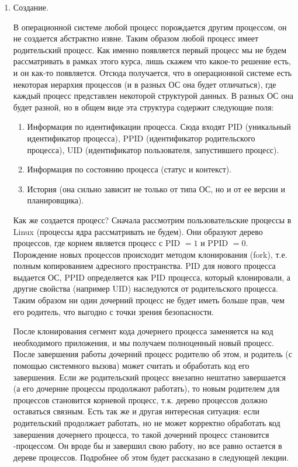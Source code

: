 
\begin{enumerate}
\item
  Создание.
  
  В операционной системе любой процесс порождается другим процессом, он не
  создается абстрактно извне. Таким образом любой процесс имеет родительский
  процесс. Как именно появляется первый процесс мы не будем рассматривать в
  рамках этого курса, лишь скажем что какое-то решение есть, и он как-то
  появляется. Отсюда получается, что в операционной системе есть некоторая
  иерархия процессов (и в разных ОС она будет отличаться), где каждый процесс
  представлен некоторой структурой данных. В разных ОС она будет разной, но в
  общем виде эта структура содержит следующие поля:
  
  \begin{enumerate}
  \item
    Информация по идентификации процесса. Сюда входят PID (уникальный
    идентификатор процесса), PPID (идентификатор родительского процесса), UID
    (идентификатор пользователя, запустившего процесс).
    
  \item
    Информация по состоянию процесса (статус и контекст).
    
  \item
    История (она сильно зависит не только от типа ОС, но и от ее версии и
    планировщика).
  \end{enumerate}
  
  Как же создается процесс? Сначала рассмотрим пользовательские процессы в Linux
  (процессы ядра рассматривать не будем). Они образуют дерево процессов, где
  корнем является процесс с PID \(= 1\) и PPID \(= 0\). Порождение новых
  процессов происходит методом клонирования (fork), т.е. полным копированием
  адресного пространства. PID для нового процесса выдается ОС, PPID определяется
  как PID процесса, который клонировали, а другие свойства (например UID)
  наследуются от родительского процесса. Таким образом ни один дочерний процесс
  не будет иметь больше прав, чем его родитель, что выгодно с точки зрения
  безопасности.

  После клонирования сегмент кода дочернего процесса заменяется на код
  необходимого приложения, и мы получаем полноценный новый процесс. После
  завершения работы дочерний процесс  родителю об этом, и
  родитель (с помощью системного вызова) может считать и обработать код его
  завершения. Если же родительский процесс внезапно нештатно завершается (а его
  дочерние процессы продолжают работать), то новым родителем для
   процессов становится корневой процесс, т.к. дерево
  процессов должно оставаться связным. Есть так же и другая интересная ситуация:
  если родительский продолжает работать, но не может корректно обработать код
  завершения дочернего процесса, то такой дочерний процесс становится
  -процессом. Он вроде бы и завершил свою работу, но все равно
  остается в дереве процессов. Подробнее об этом будет рассказано в следующей
  лекции.


\end{enumerate}
